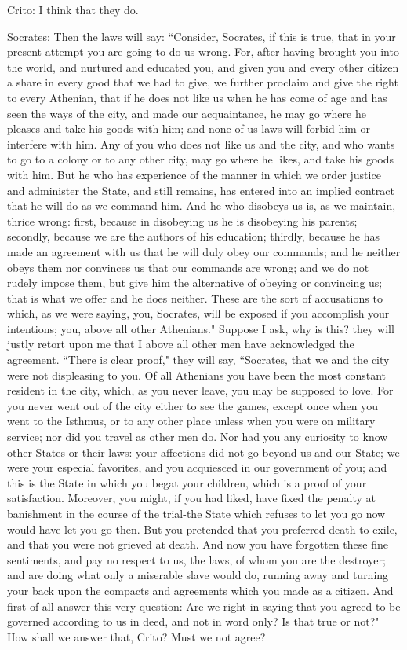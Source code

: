 Crito: I think that they do. 

Socrates: Then the laws will say: ``Consider, Socrates, if this is true,
that in your present attempt you are going to do us wrong. For, after
having brought you into the world, and nurtured and educated you,
and given you and every other citizen a share in every good that we
had to give, we further proclaim and give the right to every Athenian,
that if he does not like us when he has come of age and has seen the
ways of the city, and made our acquaintance, he may go where he pleases
and take his goods with him; and none of us laws will forbid him or
interfere with him. Any of you who does not like us and the city,
and who wants to go to a colony or to any other city, may go where
he likes, and take his goods with him. But he who has experience of
the manner in which we order justice and administer the State, and
still remains, has entered into an implied contract that he will do
as we command him. And he who disobeys us is, as we maintain, thrice
wrong: first, because in disobeying us he is disobeying his parents;
secondly, because we are the authors of his education; thirdly, because
he has made an agreement with us that he will duly obey our commands;
and he neither obeys them nor convinces us that our commands are wrong;
and we do not rudely impose them, but give him the alternative of
obeying or convincing us; that is what we offer and he does neither.
These are the sort of accusations to which, as we were saying, you,
Socrates, will be exposed if you accomplish your intentions; you,
above all other Athenians." Suppose I ask, why is this? they will
justly retort upon me that I above all other men have acknowledged
the agreement. ``There is clear proof," they will say, ``Socrates, that
we and the city were not displeasing to you. Of all Athenians you
have been the most constant resident in the city, which, as you never
leave, you may be supposed to love. For you never went out of the
city either to see the games, except once when you went to the Isthmus,
or to any other place unless when you were on military service; nor
did you travel as other men do. Nor had you any curiosity to know
other States or their laws: your affections did not go beyond us and
our State; we were your especial favorites, and you acquiesced in
our government of you; and this is the State in which you begat your
children, which is a proof of your satisfaction. Moreover, you might,
if you had liked, have fixed the penalty at banishment in the course
of the trial-the State which refuses to let you go now would have
let you go then. But you pretended that you preferred death to exile,
and that you were not grieved at death. And now you have forgotten
these fine sentiments, and pay no respect to us, the laws, of whom
you are the destroyer; and are doing what only a miserable slave would
do, running away and turning your back upon the compacts and agreements
which you made as a citizen. And first of all answer this very question:
Are we right in saying that you agreed to be governed according to
us in deed, and not in word only? Is that true or not?" How shall
we answer that, Crito? Must we not agree? 

